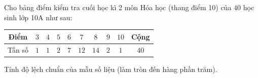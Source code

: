 \begin{ex}
Cho bảng điểm kiểm tra cuối học kì 2 môn Hóa học (thang điểm 10) của $40$ học sinh lớp 10A như sau:
\begin{center}
\begin{tabular}{|c|c|c|c|c|c|c|c|c|c|}\hline
Điểm & $3$ & $4$ & $5$ & $6$ & $7$ & $8$ & $9$ & $10$ & Cộng\\\hline
Tần số & $1$ & $1$ & $2$ & $7$ & $12$ & $14$ & $2$ & $1$ & $40$\\\hline
\end{tabular}
\end{center}
Tính độ lệch chuẩn của mẫu số liệu (làm tròn đến hàng phần trăm).
\end{ex}
